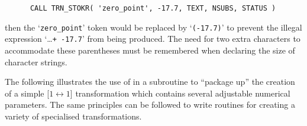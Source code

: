 \begin{verbatim}
      CALL TRN_STOKR( 'zero_point', -17.7, TEXT, NSUBS, STATUS )
\end{verbatim}

then the `\verb#zero_point#' token would be replaced by `\verb#(-17.7)#' to
prevent the illegal expression \mbox{`\ldots {\tt + -17.7}'} from being
produced. 
The need for two extra characters to accommodate these parentheses must be
remembered when declaring the size of character strings. 

The following illustrates the use of  in a subroutine to
``package up'' the creation of a simple \mbox{[$1 \leftrightarrow 1$]}
transformation which contains several adjustable numerical parameters.
The same principles can be followed to write routines for creating a variety
of specialised transformations. 

